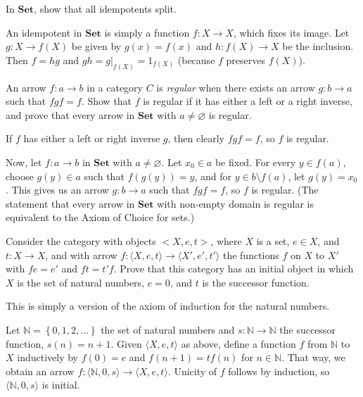 \begin{exercise}
In $\mathbf{Set}$, show that all idempotents split.
\end{exercise}
\begin{solution}
An idempotent in $\mathbf{Set}$ is simply a function $f\colon X\to X$, which fixes its image. Let $g:X\to f(X)$ be given by $g(x)=f(x)$ and $h:f(X)\to X$ be the inclusion. Then $f=hg$ and $gh=g|_{f(X)}=1_{f(X)}$ (because $f$ preserves $f(X)$).
\end{solution}

\begin{exercise}
An arrow $f:a\to b$ in a category $C$ is \emph{regular} when there exists an arrow $g:b\to a$ such that $fgf=f$. Show that $f$ is regular if it has either a left or a right inverse, and prove that every arrow in $\mathbf{Set}$ with $a\neq\varnothing$ is regular.
\end{exercise}
\begin{solution}
If $f$ has either a left or right inverse $g$, then clearly $fgf=f$, so $f$ is regular.

Now, let $f:a\to b$ in $\mathbf{Set}$ with $a\neq\varnothing$. Let $x_0\in a$ be fixed. For every $y\in f(a)$, choose $g(y)\in a$ such that $f(g(y))=y$, and for $y\in b\setminus f(a)$, let $g(y)=x_0$. This gives us an arrow $g:b\to a$ such that $fgf=f$, so $f$ is regular. (The statement that every arrow in $\mathbf{Set}$ with non-empty domain is regular is equivalent to the Axiom of Choice for sets.)
\end{solution}

\begin{exercise}
Consider the category with objects $<X,e,t>$, where $X$ is a set, $e\in X$, and $t:X\to X$, and with arrow $f:\langle X,e,t\rangle\to\langle X',e',t'\rangle$ the functions $f$ on $X$ to $X'$ with $fe=e'$ and $ft=t'f$. Prove that this category has an initial object in which $X$ is the set of natural numbers, $e=0$, and $t$ is the successor function.
\end{exercise}
\begin{solution}
This is simply a version of the axiom of induction for the natural numbers.

Let $\mathbb{N}=\left\{0,1,2,\ldots\right\}$ the set of natural numbers and $s:\mathbb{N}\to\mathbb{N}$ the successor function, $s(n)=n+1$. Given $\langle X,e,t\rangle$ as above, define a function $f$ from $\mathbb{N}$ to $X$ inductively by $f(0)=e$ and $f(n+1)=tf(n)$ for $n\in\mathbb{N}$. That way, we obtain an arrow $f:\langle\mathbb{N},0,s\rangle\to \langle X,e,t\rangle$. Unicity of $f$ follows by induction, so $\langle\mathbb{N},0,s\rangle$ is initial.
\end{solution}


